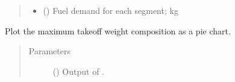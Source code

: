 \documentclass[letterpaper,10pt,english]{sphinxmanual}
\begin{document}
\begin{fulllineitems}
\begin{fulllineitems}
\begin{quote}
\begin{description}
\begin{itemize}
\item {} 
\sphinxAtStartPar
{} (\sphinxstyleliteralemphasis{\sphinxupquote{{[}}}\sphinxstyleliteralemphasis{\sphinxupquote{{]}}}) \textendash{} Fuel demand for each segment; kg

\end{itemize}

\end{description}\end{quote}

\end{fulllineitems}


\begin{fulllineitems}
\label{\detokenize{modules/helicopter:helicopter.Helicopter.plot_masses_pie}}
\sphinxAtStartPar
Plot the maximum take\sphinxhyphen{}off weight composition as a pie chart.
\begin{quote}\begin{description}
\item[{Parameters}] \leavevmode
\sphinxAtStartPar
{} () \textendash{} Output of {\hyperref[\detokenize{modules/helicopter:helicopter.Helicopter.mass_estimation}]{}}.

\end{description}\end{quote}

\end{fulllineitems}



\end{fulllineitems}
\end{document}
